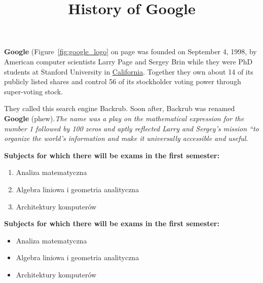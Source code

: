 \begin{flushleft}
  \setlength{\parindent}{1em} 
 \title{\Large \textbf{History of Google}}
 \vspace{0.2cm}
  \par
 \textbf{Google} (Figure~\ref{fig:google_logo} on page \pageref{fig:google_logo} was founded on September 4, 1998, by American computer scientists Larry  Page and Sergey Brin while they were PhD students at Stanford University in \underline{California}. Together they own about 14 of its publicly listed shares and control 56 of its stockholder voting power through super-voting stock. \par
 \vspace{0.1cm}
  They called this search engine Backrub. Soon after, Backrub was renamed \textbf{Google} (phew).\emph{The name was a play on the mathematical expression for the number 1 followed by 100 zeros and aptly reflected Larry and Sergey's mission “to organize the world's information and make it universally accessible and useful}.
\end{flushleft}
\textbf{\large Subjects for which there will be exams in the first semester:}
\begin{enumerate}
    \item Analiza matematyczna
    \item Algebra liniowa i geometria analityczna
    \item Architektury komputerów
\end{enumerate}
\vspace{0.7cm}
\textbf{\Large Subjects for which there will be exams in the first semester:}
    \begin{itemize}
    \item Analiza matematyczna
    \item Algebra liniowa i geometria analityczna
    \item Architektury komputerów
\end{itemize}
